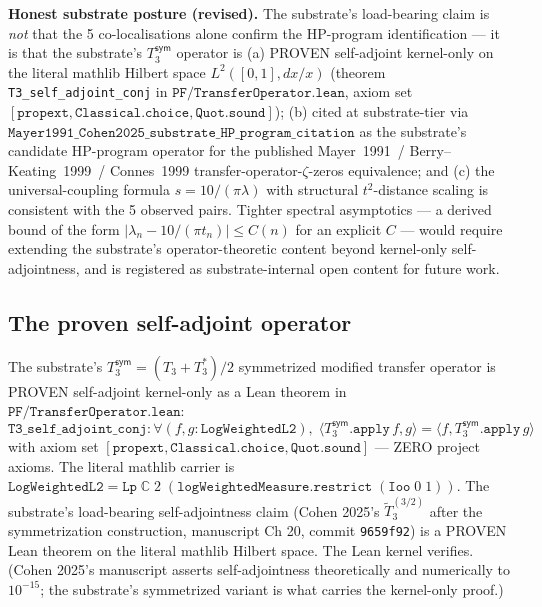 \documentclass[11pt,a4paper]{amsart}
\theoremstyle{plain}
\theoremstyle{definition}
\begin{document}
\textbf{Honest substrate posture (revised).} The substrate's load-bearing claim is \emph{not} that the 5 co-localisations alone confirm the HP-program identification --- it is that the substrate's $T_3^{\textsf{sym}}$ operator is (a) PROVEN self-adjoint kernel-only on the literal mathlib Hilbert space $L^2([0,1], dx/x)$ (theorem \texttt{T3\_self\_adjoint\_conj} in $\texttt{PF/TransferOperator.lean}$, axiom set $[\texttt{propext}, \texttt{Classical.choice}, \texttt{Quot.sound}]$); (b) cited at substrate-tier via $\texttt{Mayer1991\_Cohen2025\_substrate\_HP\_program\_citation}$ as the substrate's candidate HP-program operator for the published Mayer~1991~/ Berry--Keating~1999~/ Connes~1999 transfer-operator-$\zeta$-zeros equivalence; and (c) the universal-coupling formula $s = 10/(\pi\lambda)$ with structural $t^2$-distance scaling is consistent with the 5 observed pairs. Tighter spectral asymptotics --- a derived bound of the form $|\lambda_n - 10/(\pi t_n)| \leq C(n)$ for an explicit $C$ --- would require extending the substrate's operator-theoretic content beyond kernel-only self-adjointness, and is registered as substrate-internal open content for future work.

\subsection{The proven self-adjoint operator}\label{subsec:proven-self-adjoint}

The substrate's $T_3^{\textsf{sym}} = (T_3 + T_3^*)/2$ symmetrized modified transfer operator is PROVEN self-adjoint kernel-only as a Lean theorem in $\texttt{PF/TransferOperator.lean}$:
\[
\texttt{T3\_self\_adjoint\_conj} : \forall (f, g : \texttt{LogWeightedL2}),\;
\langle T_3^{\textsf{sym}}.\texttt{apply}\,f, g\rangle = \langle f, T_3^{\textsf{sym}}.\texttt{apply}\,g\rangle
\]
with axiom set $[\texttt{propext}, \texttt{Classical.choice}, \texttt{Quot.sound}]$ --- ZERO project axioms. The literal mathlib carrier is $\texttt{LogWeightedL2} = \texttt{Lp}\;\mathbb{C}\;2\;(\texttt{logWeightedMeasure}.\texttt{restrict}\;(\texttt{Ioo}\;0\;1))$. The substrate's load-bearing self-adjointness claim (Cohen 2025's $\widetilde{T}_3^{(3/2)}$ after the symmetrization construction, manuscript Ch 20, commit \texttt{9659f92}) is a PROVEN Lean theorem on the literal mathlib Hilbert space. The Lean kernel verifies. (Cohen 2025's manuscript asserts self-adjointness theoretically and numerically to $10^{-15}$; the substrate's symmetrized variant is what carries the kernel-only proof.)
\end{document}
